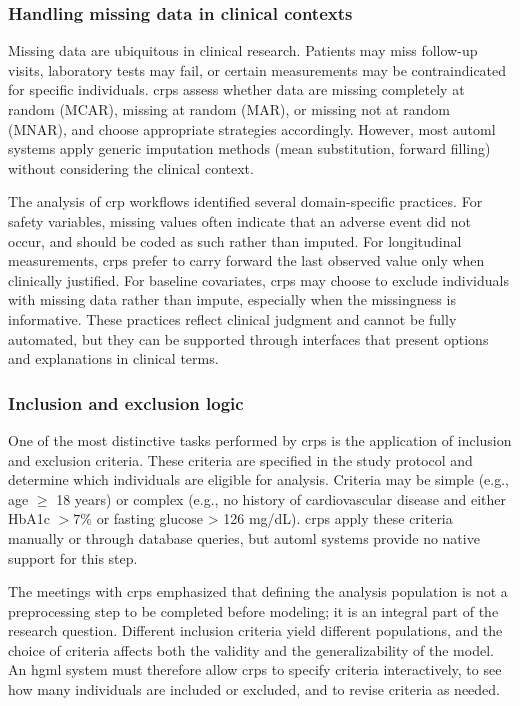 \documentclass[twoside,final]{Contexto}
\begin{document}
\subsubsection{Handling missing data in clinical contexts}

Missing data are ubiquitous in clinical research. Patients may miss follow-up visits, laboratory tests may fail, or certain measurements may be contraindicated for specific individuals. \glspl{crp} assess whether data are missing completely at random (MCAR), missing at random (MAR), or missing not at random (MNAR), and choose appropriate strategies accordingly. However, most \gls{automl} systems apply generic imputation methods (mean substitution, forward filling) without considering the clinical context.

The analysis of \gls{crp} workflows identified several domain-specific practices. For safety variables, missing values often indicate that an adverse event did not occur, and should be coded as such rather than imputed. For longitudinal measurements, \glspl{crp} prefer to carry forward the last observed value only when clinically justified. For baseline covariates, \glspl{crp} may choose to exclude individuals with missing data rather than impute, especially when the missingness is informative. These practices reflect clinical judgment and cannot be fully automated, but they can be supported through interfaces that present options and explanations in clinical terms.

\subsubsection{Inclusion and exclusion logic}

One of the most distinctive tasks performed by \glspl{crp} is the application of inclusion and exclusion criteria. These criteria are specified in the study protocol and determine which individuals are eligible for analysis. Criteria may be simple (e.g., age $\geq$ 18 years) or complex (e.g., no history of cardiovascular disease and either HbA1c $> 7\%$ or fasting glucose > 126 mg/dL). \glspl{crp} apply these criteria manually or through database queries, but \gls{automl} systems provide no native support for this step.

The meetings with \glspl{crp} emphasized that defining the analysis population is not a preprocessing step to be completed before modeling; it is an integral part of the research question. Different inclusion criteria yield different populations, and the choice of criteria affects both the validity and the generalizability of the model. An \gls{hgml} system must therefore allow \glspl{crp} to specify criteria interactively, to see how many individuals are included or excluded, and to revise criteria as needed.
\end{document}
